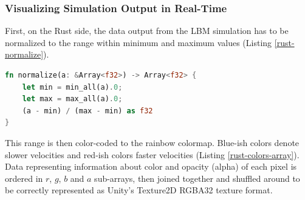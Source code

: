 %
%
%



\subsubsection{Visualizing Simulation Output in Real-Time}
First, on the Rust side, the data output from the LBM simulation has to be normalized to the range within minimum and maximum values (Listing \ref{rust-normalize}). 

\begin{lstlisting}[language=Rust, caption=Normalization of the simulation output., label=rust-normalize]
fn normalize(a: &Array<f32>) -> Array<f32> {
	let min = min_all(a).0;
	let max = max_all(a).0;
	(a - min) / (max - min) as f32
}
\end{lstlisting}


This range is then color-coded to the rainbow colormap. Blue-ish colors denote slower velocities and red-ish colors faster velocities (Listing \ref{rust-colors-array}). Data representing information about color and opacity (alpha) of each pixel is ordered in $r$, $g$, $b$ and $a$ sub-arrays, then joined together and shuffled around to be correctly represented as Unity's Texture2D RGBA32 texture format.

